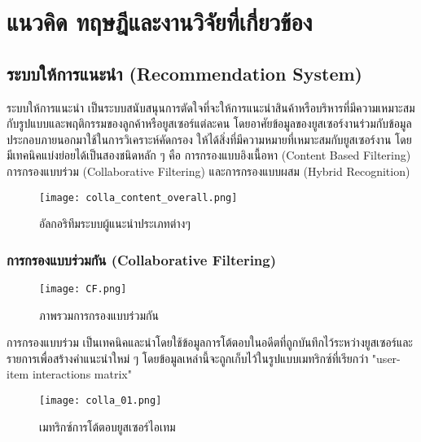 \chapter{แนวคิด ทฤษฎีและงานวิจัยที่เกี่ยวข้อง}
\label{chapter:related-theory}

\section{ระบบให้การแนะนำ (Recommendation System)}
ระบบให้การแนะนำ \cite[baptiste]{baptiste} เป็นระบบสนับสนุนการตัดใจที่จะให้การแนะนำสินค้าหรือบริหารที่มีความเหมาะสมกับรูปแบบและพฤติกรรมของลูกค้าหรือยูสเซอร์แต่ละคน โดยอาศัยข้อมูลของยูสเซอร์งานร่วมกับข้อมูลประกอบภายนอกมาใช้ในการวิเคราะห์คัดกรอง ให้ได้สิ่งที่มีความหมายที่เหมาะสมกับยูสเซอร์งาน โดยมีเทคนิคแบ่งย่อยได้เป็นสองชนิดหลัก ๆ คือ การกรองแบบอิงเนื้อหา (Content Based Filtering) การกรองแบบร่วม (Collaborative Filtering) และการกรองแบบผสม (Hybrid Recognition) \cite{robin}

\begin{figure}[!h]
  \centering
  \texttt{[image: colla\_content\_overall.png]}  
  \caption{\cite[baptiste]{baptiste}อัลกอริทึมระบบผู้แนะนำประเภทต่างๆ}
  \label{Fig:colla_content_overall}
\end{figure}

\subsection{การกรองแบบร่วมกัน (Collaborative Filtering)}
\begin{figure}[!h]
  \centering
  \texttt{[image: CF.png]}  
  \caption{ภาพรวมการกรองแบบร่วมกัน}
  \label{Fig:cf}
\end{figure}
การกรองแบบร่วม เป็นเทคนิคและนำโดยใช้ข้อมูลการโต้ตอบในอดีตที่ถูกบันทึกไว้ระหว่างยูสเซอร์และรายการเพื่อสร้างคำแนะนำใหม่ ๆ โดยข้อมูลเหล่านี้จะถูกเก็บไว้ในรูปแบบเมทริกซ์ที่เรียกว่า "user-item interactions matrix"
\newline
\begin{figure}[!h]
  \centering
  \texttt{[image: colla\_01.png]}  
  \caption{เมทริกซ์การโต้ตอบยูสเซอร์ไอเทม}
  \label{Fig:colla_01}
\end{figure}

